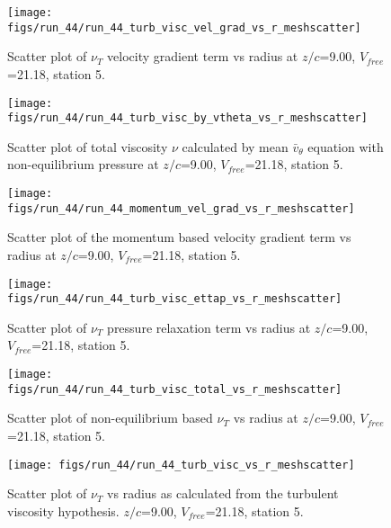 \begin{figure}[H]
\centering
\texttt{[image: figs/run\_44/run\_44\_turb\_visc\_vel\_grad\_vs\_r\_meshscatter]}
\caption{Scatter plot of $\nu_T$ velocity gradient term vs radius at $z/c$=9.00, $V_{free}$=21.18, station 5.}
\end{figure}


\begin{figure}[H]
\centering
\texttt{[image: figs/run\_44/run\_44\_turb\_visc\_by\_vtheta\_vs\_r\_meshscatter]}
\caption{Scatter plot of total viscosity $\nu$ calculated by mean $\bar{v}_{\theta}$ equation with non-equilibrium pressure at $z/c$=9.00, $V_{free}$=21.18, station 5.}
\end{figure}


\begin{figure}[H]
\centering
\texttt{[image: figs/run\_44/run\_44\_momentum\_vel\_grad\_vs\_r\_meshscatter]}
\caption{Scatter plot of the momentum based velocity gradient term vs radius at $z/c$=9.00, $V_{free}$=21.18, station 5.}
\end{figure}


\begin{figure}[H]
\centering
\texttt{[image: figs/run\_44/run\_44\_turb\_visc\_ettap\_vs\_r\_meshscatter]}
\caption{Scatter plot of $\nu_T$ pressure relaxation term vs radius at $z/c$=9.00, $V_{free}$=21.18, station 5.}
\end{figure}


\begin{figure}[H]
\centering
\texttt{[image: figs/run\_44/run\_44\_turb\_visc\_total\_vs\_r\_meshscatter]}
\caption{Scatter plot of non-equilibrium based $\nu_T$ vs radius at $z/c$=9.00, $V_{free}$=21.18, station 5.}
\end{figure}


\begin{figure}[H]
\centering
\texttt{[image: figs/run\_44/run\_44\_turb\_visc\_vs\_r\_meshscatter]}
\caption{Scatter plot of $\nu_T$ vs radius as calculated from the turbulent viscosity hypothesis. $z/c$=9.00, $V_{free}$=21.18, station 5.}
\end{figure}


